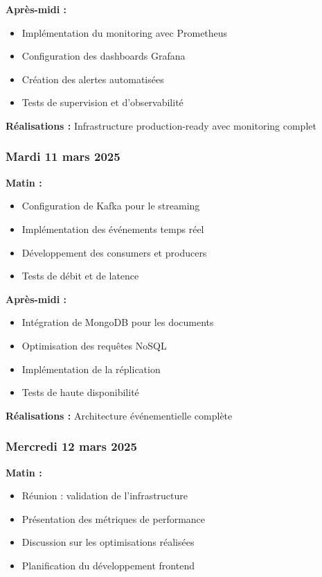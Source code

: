 \documentclass[a4paper,12pt]{article}
\begin{document}
\textbf{Après-midi :}
\begin{itemize}
    \item Implémentation du monitoring avec Prometheus
    \item Configuration des dashboards Grafana
    \item Création des alertes automatisées
    \item Tests de supervision et d'observabilité
\end{itemize}

\textbf{Réalisations :} Infrastructure production-ready avec monitoring complet

\subsubsection*{Mardi 11 mars 2025}
\textbf{Matin :}
\begin{itemize}
    \item Configuration de Kafka pour le streaming
    \item Implémentation des événements temps réel
    \item Développement des consumers et producers
    \item Tests de débit et de latence
\end{itemize}

\textbf{Après-midi :}
\begin{itemize}
    \item Intégration de MongoDB pour les documents
    \item Optimisation des requêtes NoSQL
    \item Implémentation de la réplication
    \item Tests de haute disponibilité
\end{itemize}

\textbf{Réalisations :} Architecture événementielle complète

\subsubsection*{Mercredi 12 mars 2025}
\textbf{Matin :}
\begin{itemize}
    \item Réunion : validation de l'infrastructure
    \item Présentation des métriques de performance
    \item Discussion sur les optimisations réalisées
    \item Planification du développement frontend
\end{itemize}
\end{document}
